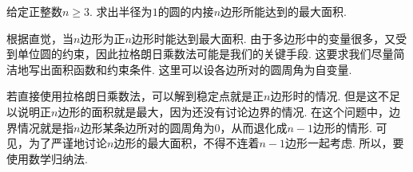 \begin{example}[2021]
\label{ex:ch06-27}
给定正整数$n \ge 3$.
求出半径为$1$的圆的内接$n$边形所能达到的最大面积.
\end{example}

\begin{analysis}
根据直觉，当$n$边形为正$n$边形时能达到最大面积.
由于多边形中的变量很多，又受到单位圆的约束，因此拉格朗日乘数法可能是我们的关键手段.
这要求我们尽量简洁地写出面积函数和约束条件.
这里可以设各边所对的圆周角为自变量.

若直接使用拉格朗日乘数法，可以解到稳定点就是正$n$边形时的情况.
但是这不足以说明正$n$边形的面积就是最大，因为还没有讨论边界的情况.
在这个问题中，边界情况就是指$n$边形某条边所对的圆周角为$0$，从而退化成$n-1$边形的情形.
可见，为了严谨地讨论$n$边形的最大面积，不得不连着$n-1$边形一起考虑.
所以，要使用数学归纳法.

\end{analysis}

